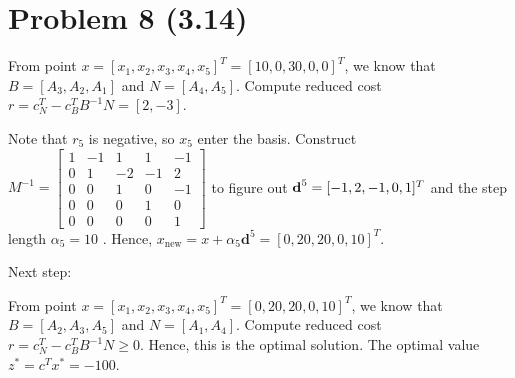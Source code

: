 \documentclass[12pt]{article}
\begin{document}
\section*{Problem 8 (3.14)}

From point $x = [x_1, x_2, x_3, x_4, x_5]^T = [10, 0, 30, 0, 0]^T$, we know that $B = [A_3, A_2, A_1]$ and $N = [A_4, A_5]$. Compute reduced cost $r = c_N^T - c_B^TB^{-1}N = [2, -3]$.

Note that $r_5$ is negative, so $x_5$ enter the basis. Construct $M^{-1} = \begin{bmatrix}
1 & -1 & 1 & 1 & -1 \\
0 & 1 & -2 & -1 & 2 \\
0 & 0 & 1 & 0 & -1 \\
0 & 0 & 0 & 1 & 0 \\
0 & 0 & 0 & 0 & 1
\end{bmatrix}$ to figure out $\textbf d^5 = [-1, 2, -1, 0, 1]^T$  and the step length $\alpha_5 = 10$ . Hence, $x_{\text{new}} = x + \alpha_5\textbf{d}^5 = [0, 20, 20, 0, 10]^T$. 

Next step:

From point $x = [x_1, x_2, x_3, x_4, x_5]^T = [0, 20, 20, 0, 10]^T$, we know that $B = [A_2, A_3, A_5]$ and $N = [A_1, A_4]$. Compute reduced cost $r = c_N^T - c_B^TB^{-1}N \geqslant 0$. Hence, this is the optimal solution. The optimal value $z^* = c^Tx^* = -100 $.
\end{document}
